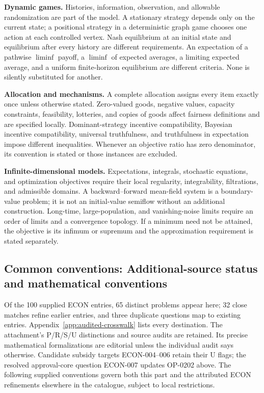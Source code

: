 \documentclass[11pt,a4paper]{article}
\begin{document}
\textbf{Dynamic games.} Histories, information, observation, and allowable
randomization are part of the model. A stationary strategy depends only on
the current state; a positional strategy in a deterministic graph game
chooses one action at each controlled vertex. Nash equilibrium at an initial
state and equilibrium after every history are different requirements.
An expectation of a pathwise $\liminf$ payoff, a $\liminf$ of expected averages,
a limiting expected average, and a uniform finite-horizon equilibrium are
different criteria. None is silently substituted for another.

\textbf{Allocation and mechanisms.} A complete allocation assigns every item
exactly once unless otherwise stated. Zero-valued goods, negative values,
capacity constraints, feasibility, lotteries, and copies of goods affect
fairness definitions and are specified locally. Dominant-strategy incentive
compatibility, Bayesian incentive compatibility, universal truthfulness,
and truthfulness in expectation impose different inequalities. Whenever
an objective ratio has zero denominator, its convention is stated or those
instances are excluded.

\textbf{Infinite-dimensional models.} Expectations, integrals, stochastic
equations, and optimization objectives require their local regularity,
integrability, filtrations, and admissible domains. A backward--forward
mean-field system is a boundary-value problem; it is not an initial-value
semiflow without an additional construction. Long-time, large-population,
and vanishing-noise limits require an order of limits and a convergence
topology. If a minimum need not be attained, the objective is its infimum
or supremum and the approximation requirement is stated separately.

\subsection*{Common conventions: Additional-source status and mathematical conventions}

\label{audited:conventions}

Of the 100 supplied ECON entries, 65 distinct problems appear here; 32 close
matches refine earlier entries, and three duplicate questions map to existing
entries. Appendix~\ref{app:audited-crosswalk} lists every destination.
The attachment's P/R/S/U distinctions and source audits are retained. Its
precise mathematical formalizations are editorial unless the individual audit
says otherwise. Candidate subsidy targets ECON-004--006 retain their U flags;
the resolved approval-core question ECON-007 updates OP-0202 above.
The following supplied conventions govern both this part and the attributed
ECON refinements elsewhere in the catalogue, subject to local restrictions.
\end{document}
